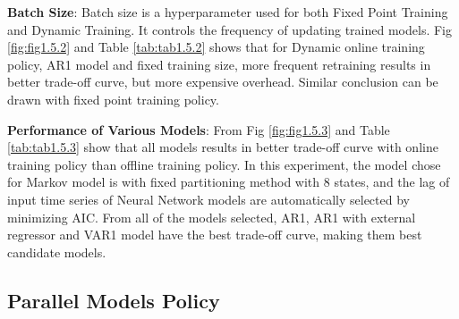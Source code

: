 \documentclass{article}
\begin{document}
\begin{flushleft}
\textbf{Batch Size}: Batch size is a hyperparameter used for both Fixed Point Training and Dynamic Training. It controls the frequency of updating trained models. Fig \ref{fig:fig1.5.2} and Table \ref{tab:tab1.5.2} shows that for Dynamic online training policy, AR1 model and fixed training size, more frequent retraining results in better trade-off curve, but more expensive overhead. Similar conclusion can be drawn with fixed point training policy.
\end{flushleft}

\begin{flushleft}
\textbf{Performance of Various Models}: From Fig \ref{fig:fig1.5.3} and Table \ref{tab:tab1.5.3} show that all models results in better trade-off curve with online training policy than offline training policy. In this experiment, the model chose for Markov model is with fixed partitioning method with $8$ states, and the lag of input time series of Neural Network models are automatically selected by minimizing AIC. From all of the models selected, AR1, AR1 with external regressor and VAR1 model have the best trade-off curve, making them best candidate models.
\end{flushleft}

\subsection{Parallel Models Policy}
\end{document}
